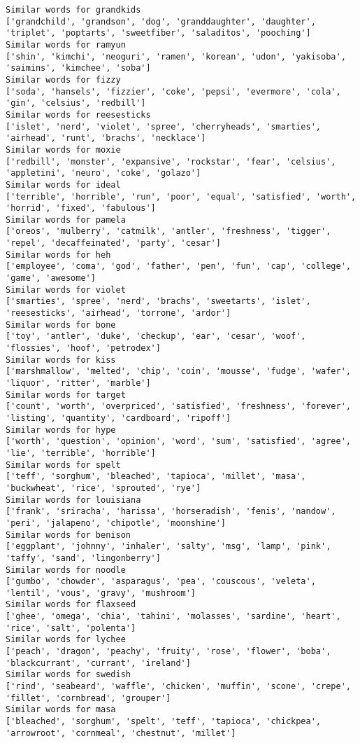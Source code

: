 \documentclass[11pt]{article}
\begin{document}
\begin{Verbatim}[commandchars=\\\{\}]
Similar words for grandkids
['grandchild', 'grandson', 'dog', 'granddaughter', 'daughter', 'triplet', 'poptarts', 'sweetfiber', 'saladitos', 'pooching']
Similar words for ramyun
['shin', 'kimchi', 'neoguri', 'ramen', 'korean', 'udon', 'yakisoba', 'saimins', 'kimchee', 'soba']
Similar words for fizzy
['soda', 'hansels', 'fizzier', 'coke', 'pepsi', 'evermore', 'cola', 'gin', 'celsius', 'redbill']
Similar words for reesesticks
['islet', 'nerd', 'violet', 'spree', 'cherryheads', 'smarties', 'airhead', 'runt', 'brachs', 'necklace']
Similar words for moxie
['redbill', 'monster', 'expansive', 'rockstar', 'fear', 'celsius', 'appletini', 'neuro', 'coke', 'golazo']
Similar words for ideal
['terrible', 'horrible', 'run', 'poor', 'equal', 'satisfied', 'worth', 'horrid', 'fixed', 'fabulous']
Similar words for pamela
['oreos', 'mulberry', 'catmilk', 'antler', 'freshness', 'tigger', 'repel', 'decaffeinated', 'party', 'cesar']
Similar words for heh
['employee', 'coma', 'god', 'father', 'pen', 'fun', 'cap', 'college', 'game', 'awesome']
Similar words for violet
['smarties', 'spree', 'nerd', 'brachs', 'sweetarts', 'islet', 'reesesticks', 'airhead', 'torrone', 'ardor']
Similar words for bone
['toy', 'antler', 'duke', 'checkup', 'ear', 'cesar', 'woof', 'flossies', 'hoof', 'petrodex']
Similar words for kiss
['marshmallow', 'melted', 'chip', 'coin', 'mousse', 'fudge', 'wafer', 'liquor', 'ritter', 'marble']
Similar words for target
['count', 'worth', 'overpriced', 'satisfied', 'freshness', 'forever', 'listing', 'quantity', 'cardboard', 'ripoff']
Similar words for hype
['worth', 'question', 'opinion', 'word', 'sum', 'satisfied', 'agree', 'lie', 'terrible', 'horrible']
Similar words for spelt
['teff', 'sorghum', 'bleached', 'tapioca', 'millet', 'masa', 'buckwheat', 'rice', 'sprouted', 'rye']
Similar words for louisiana
['frank', 'sriracha', 'harissa', 'horseradish', 'fenis', 'nandow', 'peri', 'jalapeno', 'chipotle', 'moonshine']
Similar words for benison
['eggplant', 'johnny', 'inhaler', 'salty', 'msg', 'lamp', 'pink', 'taffy', 'sand', 'lingonberry']
Similar words for noodle
['gumbo', 'chowder', 'asparagus', 'pea', 'couscous', 'veleta', 'lentil', 'vous', 'gravy', 'mushroom']
Similar words for flaxseed
['ghee', 'omega', 'chia', 'tahini', 'molasses', 'sardine', 'heart', 'rice', 'salt', 'polenta']
Similar words for lychee
['peach', 'dragon', 'peachy', 'fruity', 'rose', 'flower', 'boba', 'blackcurrant', 'currant', 'ireland']
Similar words for swedish
['rind', 'seabeard', 'waffle', 'chicken', 'muffin', 'scone', 'crepe', 'fillet', 'cornbread', 'grouper']
Similar words for masa
['bleached', 'sorghum', 'spelt', 'teff', 'tapioca', 'chickpea', 'arrowroot', 'cornmeal', 'chestnut', 'millet']

\end{Verbatim}
\end{document}
